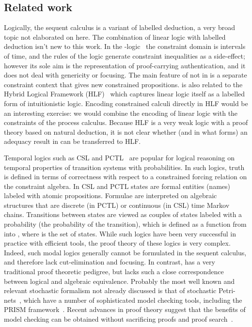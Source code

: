 \documentclass{article}
\begin{document}
\begin{lem}
\section{Related work}
\label{sec:related}

Logically, the \hyll sequent calculus is a variant of labelled deduction, a very
broad topic not elaborated on here. The combination of linear logic with
labelled deduction isn't new to this work. In the
-logic~\cite{deyoung08csf} the constraint domain is intervals of time, and
the rules of the logic generate constraint inequalities as a side-effect;
however its sole aim is the representation of proof-carrying authentication, and
it does not deal with genericity or focusing. The main feature of  not in
\hyll is a separate constraint context that gives new constrained
propositions. \hyll is also related to the Hybrid Logical Framework
(HLF)~\cite{reed06hylo} which captures linear logic itself as a labelled form of
intuitionistic logic. Encoding constrained  calculi directly in HLF would
be an interesting exercise: we would combine the encoding of linear logic with
the constraints of the process calculus. Because HLF is a very weak logic with a
proof theory based on natural deduction, it is not clear whether (and in what
forms) an adequacy result in \hyll can be transferred to HLF.



Temporal logics such as CSL and PCTL~\cite{hansson94fac} are popular
for logical reasoning on temporal properties of transition systems with probabilities.
In such logics, truth is defined in terms of correctness with respect to a
constrained forcing relation on the constraint algebra.
In CSL and PCTL
states are formal entities (names) labeled with atomic propositions.
Formulae are interpreted on algebraic structures that are discrete (in PCTL)
or continuous (in CSL) time Markov chains.
Transitions between states are viewed as couples of states labeled with a probability
(the probability of the transition), which is defined as a function
from  into , where  is the set of states.
While such logics have been very successful in practice with
efficient tools, the proof theory of these logics is very complex. Indeed, such
modal logics generally cannot be formulated in the sequent calculus, and
therefore lack cut-elimination and focusing. In contrast, \hyll has a very
traditional proof theoretic pedigree, but lacks such a close correspondence
between logical and algebraic equivalence. Probably the most well known and
relevant stochastic formalism not already discussed is that of stochastic
Petri-nets~\cite{marsan95book}, which have a number of sophisticated model
checking tools, including the PRISM framework~\cite{kwiatkowska04sttt}. Recent
advances in proof theory suggest that the benefits of model checking can be
obtained without sacrificing proofs and proof search~\cite{baelde07cade}.


\end{lem}
\end{document}
